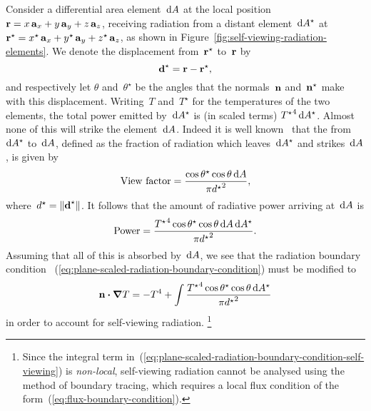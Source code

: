 Consider a differential area element~$\mathop{}\!\mathrm{d} A$ at the local position~%
$\boldsymbol{\mathbf{r}} = x \mathop{}\!\boldsymbol{\mathbf{a}}_{x} + y \mathop{}\!\boldsymbol{\mathbf{a}}_{y} + z \mathop{}\!\boldsymbol{\mathbf{a}}_{z}$,
receiving radiation from a distant element~$\mathop{}\!\mathrm{d} A^\star$ at~%
$\boldsymbol{\mathbf{r}}^\star =
  x^\star \mathop{}\!\boldsymbol{\mathbf{a}}_{x} + y^\star \mathop{}\!\boldsymbol{\mathbf{a}}_{y} + z^\star \mathop{}\!\boldsymbol{\mathbf{a}}_{z}$,
as shown in Figure~\ref{fig:self-viewing-radiation-elements}.
We denote the displacement from~$\boldsymbol{\mathbf{r}}^\star$ to~$\boldsymbol{\mathbf{r}}$ by
\begin{equation}
  \boldsymbol{\mathbf{d}}^\star = \boldsymbol{\mathbf{r}} - \boldsymbol{\mathbf{r}}^\star,
  \label{eq:radiation-self-viewing-displacement}
\end{equation}
and respectively let $\theta$ and~$\theta^\star$ be the angles
that the normals~$\mathop{}\!\boldsymbol{\mathbf{n}}$ and~$\mathop{}\!\boldsymbol{\mathbf{n}}^\star$
make with this displacement.
Writing~$T$ and~$T^\star$ for the temperatures of the two elements,
the total power emitted by~$\mathop{}\!\mathrm{d} A^\star$
is (in scaled terms) ${T^\star}^4 \mathop{}\!\mathrm{d} A^\star$.
Almost none of this will strike the element~$\mathop{}\!\mathrm{d} A$.
Indeed it is well known~\cite{howell-2010-thermal-radiation-heat-transfer}
that the  from~$\mathop{}\!\mathrm{d} A^\star$ to~$\mathop{}\!\mathrm{d} A$,
defined as the fraction of radiation which leaves~$\mathop{}\!\mathrm{d} A^\star$
and strikes~$\mathop{}\!\mathrm{d} A$,
is given by
\begin{equation}
  \textnormal{View factor} =
    \frac{\cos\theta^\star \cos\theta \mathop{}\!\mathrm{d} A}{\pi {d^\star}^2},
  \label{eq:radiation-self-viewing-view-factor}
\end{equation}
where~$d^\star = \lVert\boldsymbol{\mathbf{d}}^\star\rVert$.
It follows that the amount of radiative power arriving at~$\mathop{}\!\mathrm{d} A$ is
\begin{equation}
  \textnormal{Power} =
    \frac{
      {T^\star}^4 \cos\theta^\star \cos\theta \mathop{}\!\mathrm{d} A \mathop{}\!\mathrm{d} A^\star
    }{
      \pi {d^\star}^2
    }.
  \label{eq:self-viewing-power}
\end{equation}
Assuming that all of this is absorbed by~$\mathop{}\!\mathrm{d} A$,
we see that the radiation boundary condition~%
  (\ref{eq:plane-scaled-radiation-boundary-condition})
must be modified to
\begin{equation}
  \mathop{}\!\boldsymbol{\mathbf{n}} \boldsymbol{\cdot} \mathop{}\!\boldsymbol{\mathbf{\nabla}} T =
    -T^4 +
    \int
      \frac{
        {T^\star}^4 \cos\theta^\star \cos\theta \mathop{}\!\mathrm{d} A^\star
      }{
        \pi {d^\star}^2
      }
  \label{eq:plane-scaled-radiation-boundary-condition-self-viewing}
\end{equation}
in order to account for self-viewing radiation.%
\footnote{
  Since the integral term
  in~(\ref{eq:plane-scaled-radiation-boundary-condition-self-viewing})
  is \emph{non-local},
  self-viewing radiation cannot be analysed
  using the method of boundary tracing,
  which requires a local flux condition
  of the form~(\ref{eq:flux-boundary-condition}).
}
